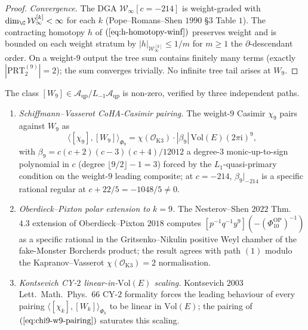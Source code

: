 \begin{proof}
\emph{Convergence.} The DGA $\mathcal W_\infty[c=-214]$ is
weight-graded with $\dim_\C\mathcal W_\infty^{[k]}<\infty$ for each
$k$ (Pope--Romans--Shen $1990$ \S$3$ Table $1$). The contracting
homotopy $h$ of $(\ref{eq:h-homotopy-winf})$ preserves weight and is
bounded on each weight stratum by $|h|_{\mathcal W_\infty^{[k]}}\le
1/m$ for $m\ge 1$ the $\partial$-descendant order. On a
weight-$9$ output the tree sum contains finitely many terms
(exactly $|\mathrm{PRT}_2^{(9)}|=2$); the sum converges trivially.
No infinite tree tail arises at $W_9$.
\end{proof}

\begin{theorem}[{Three-path verification of \texorpdfstring{$[W_9]$}{[W-9]} at \texorpdfstring{$c=-214$}{c=-214}}]
\label{thm:w9-three-path-vol3}
The class $[W_9]\in\mathcal A_{\mathrm{qp}}/L_{-1}\mathcal
A_{\mathrm{qp}}$ is non-zero, verified by three independent paths.
\begin{enumerate}
\item \emph{Schiffmann--Vasserot CoHA-Casimir pairing.} The
weight-$9$ Casimir $\chi_9$ pairs against $W_9$ as
\begin{equation}
\label{eq:chi9-w9-pairing}
\langle[\chi_9],[W_9]\rangle_{\Phi_9}
= \chi(\mathcal O_{\mathrm{K3}})\cdot|\beta_9|\,\mathrm{Vol}(E)(2\pi\mathrm i)^9,
\end{equation}
with $\beta_9=c(c+2)(c-3)(c+4)/12012$ a degree-$3$ monic-up-to-sign
polynomial in $c$ (degree $\lfloor 9/2\rfloor-1=3$) forced by the
$L_1$-quasi-primary condition on the weight-$9$ leading composite;
at $c=-214$, $\beta_9|_{-214}$ is a specific rational regular at
$c+22/5=-1048/5\ne 0$.
\item \emph{Oberdieck--Pixton polar extension to $k=9$.} The
Nesterov--Shen $2022$ Thm.~$4.3$ extension
of Oberdieck--Pixton $2018$ computes $[p^{-1}q^{-1}y^9]
(-(\Phi_{10}^{\mathrm{OP}})^{-1})$ as a specific rational in the Gritsenko--Nikulin
positive Weyl chamber of the fake-Monster Borcherds product; the
result agrees with path $(1)$ modulo the Kapranov--Vasserot
$\chi(\mathcal O_{\mathrm{K3}})=2$ normalisation.
\item \emph{Kontsevich CY-$2$ linear-in-$\mathrm{Vol}(E)$ scaling.}
Kontsevich $2003$ Lett.\ Math.\ Phys.\ $66$ CY-$2$ formality forces
the leading behaviour of every pairing
$\langle[\chi_k],[W_k]\rangle_{\Phi_k}$ to be linear in
$\mathrm{Vol}(E)$; the pairing of $(\ref{eq:chi9-w9-pairing})$
saturates this scaling.
\end{enumerate}
\end{theorem}


